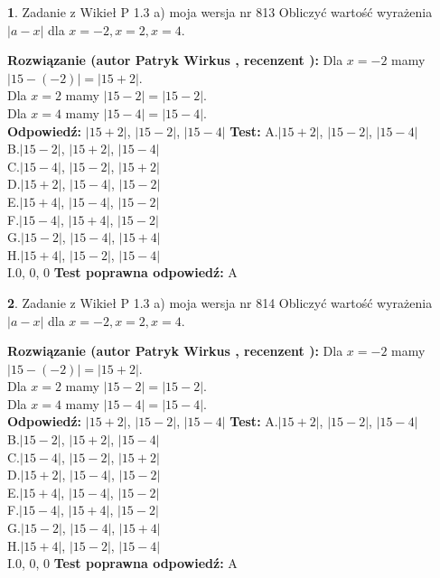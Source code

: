 \documentclass[12pt, a4paper]{article}
\theoremstyle{definition} %
\newtheorem{zad}{}
\newcommand{\zadStart}[1]{\begin{zad}#1\newline}
\newcommand{\zadStop}{\end{zad}}
\newcommand{\rozwStart}[2]{\noindent \textbf{Rozwiązanie (autor #1 , recenzent #2): }\newline}
\newcommand{\rozwStop}{\newline}
\newcommand{\odpStart}{\noindent \textbf{Odpowiedź:}\newline}
\newcommand{\odpStop}{\newline}
\newcommand{\testStart}{\noindent \textbf{Test:}\newline}
\newcommand{\testStop}{\newline}
\newcommand{\kluczStart}{\noindent \textbf{Test poprawna odpowiedź:}\newline}
\newcommand{\kluczStop}{\newline}
\begin{document}
\zadStart{Zadanie z Wikieł P 1.3 a) moja wersja nr 813}
Obliczyć wartość wyrażenia $|a - x|$ dla $x=-2,x=2,x=4$.
\zadStop
\rozwStart{Patryk Wirkus}{}
Dla $x = -2$ mamy $|15 - (-2)| = |15 + 2|$.\\
Dla $x = 2$ mamy $|15 - 2| = |15 - 2|$.\\
Dla $x = 4$ mamy $|15 - 4| = |15 - 4|$.\\
\rozwStop
\odpStart
$|15 + 2|$, $|15 - 2|$, $|15 - 4|$
\odpStop
\testStart
A.$|15 + 2|$, $|15 - 2|$, $|15 - 4|$\\
B.$|15 - 2|$, $|15 + 2|$, $|15 - 4|$\\
C.$|15 - 4|$, $|15 - 2|$, $|15 + 2|$\\
D.$|15 + 2|$, $|15 - 4|$, $|15 - 2|$\\
E.$|15 + 4|$, $|15 - 4|$, $|15 - 2|$\\
F.$|15 - 4|$, $|15 + 4|$, $|15 - 2|$\\
G.$|15 - 2|$, $|15 - 4|$, $|15 + 4|$\\
H.$|15 + 4|$, $|15 - 2|$, $|15 - 4|$\\
I.$0$, $0$, $0$
\testStop
\kluczStart
A
\kluczStop



\zadStart{Zadanie z Wikieł P 1.3 a) moja wersja nr 814}
Obliczyć wartość wyrażenia $|a - x|$ dla $x=-2,x=2,x=4$.
\zadStop
\rozwStart{Patryk Wirkus}{}
Dla $x = -2$ mamy $|15 - (-2)| = |15 + 2|$.\\
Dla $x = 2$ mamy $|15 - 2| = |15 - 2|$.\\
Dla $x = 4$ mamy $|15 - 4| = |15 - 4|$.\\
\rozwStop
\odpStart
$|15 + 2|$, $|15 - 2|$, $|15 - 4|$
\odpStop
\testStart
A.$|15 + 2|$, $|15 - 2|$, $|15 - 4|$\\
B.$|15 - 2|$, $|15 + 2|$, $|15 - 4|$\\
C.$|15 - 4|$, $|15 - 2|$, $|15 + 2|$\\
D.$|15 + 2|$, $|15 - 4|$, $|15 - 2|$\\
E.$|15 + 4|$, $|15 - 4|$, $|15 - 2|$\\
F.$|15 - 4|$, $|15 + 4|$, $|15 - 2|$\\
G.$|15 - 2|$, $|15 - 4|$, $|15 + 4|$\\
H.$|15 + 4|$, $|15 - 2|$, $|15 - 4|$\\
I.$0$, $0$, $0$
\testStop
\kluczStart
A
\kluczStop
\end{document}
